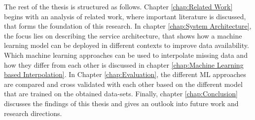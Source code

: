 The rest of the thesis is structured as follows. Chapter \ref{chap:Related Work} begins with an analysis of related work, where important literature is discussed, that forms the foundation of this research. In chapter \ref{chap:System Architecture}, the focus lies on describing the service architecture, that shows how a machine learning model can be deployed in different contexts to improve data availability. Which machine learning approaches can be used to interpolate missing data and how they differ from each other is discussed in chapter \ref{chap:Machine Learning based Interpolation}. In Chapter \ref{chap:Evaluation}, the different ML approaches are compared and cross validated with each other based on the different model that are trained on the obtained data-sets. Finally, chapter \ref{chap:Conclusion} discusses the findings of this thesis and gives an outlook into future work and research directions.
